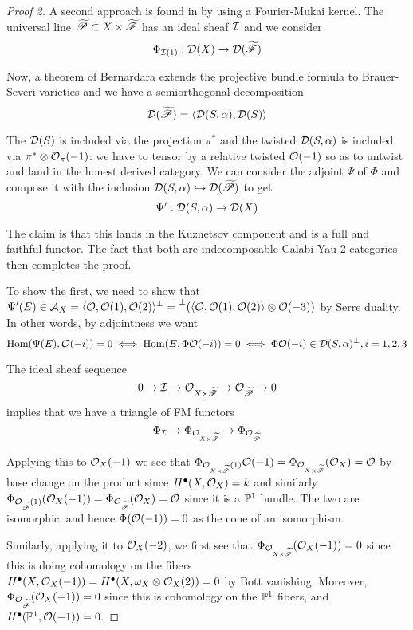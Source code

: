 \begin{proof}[Proof 2]
A second approach is found in \cite[\S7]{huybrechts_geometry_2023} by using a Fourier-Mukai kernel. The universal line $\tscrP\subset X \times \tscrF$ has an ideal sheaf $\calI$ and we consider $$\Phi_{\calI(1)}: \calD(X)\rightarrow \calD(\tscrF)$$

Now, a theorem of Bernardara \cite{bernardara_semiorthogonal_2005} extends the projective bundle formula to Brauer-Severi varieties and we have a semiorthogonal decomposition $$\calD(\tscrP)=\langle \calD(S,\alpha), \calD(S)\rangle$$

The $\calD(S)$ is included via the projection $\pi^*$ and the twisted $\calD(S,\alpha)$ is included via $\pi^*\otimes \O_\pi(-1)$: we have to tensor by a relative twisted $\O(-1)$ so as to untwist and land in the honest derived category. We can consider the adjoint $\Psi$ of $\Phi$ and compose it with the inclusion  $\calD(S,\alpha)\hookrightarrow \calD(\tscrP)$ to get $$\Psi':\calD(S,\alpha)\rightarrow \calD(X)$$

The claim is that this lands in the Kuznetsov component and is a full and faithful functor. The fact that both are indecomposable Calabi-Yau 2 categories then completes the proof.

To show the first, we need to show that $\Psi'(E)\in \calA_X= \langle \O, \O(1), \O(2)\rangle ^\perp = \lperp ( \langle \O, \O(1), \O(2)\rangle\otimes \O(-3))$ by Serre duality. In other words, by adjointness we want $$\Hom(\Psi(E), \O(-i))=0 \iff \Hom (E, \Phi \O(-i))=0 \iff \Phi \O(-i) \in \calD(S,\alpha)^\perp, i=1,2,3$$

The ideal sheaf sequence $$0\rightarrow \calI \rightarrow \O_{X\times \tscrF}\rightarrow \O_{\tscrP}\rightarrow 0$$ implies that we have a triangle of FM functors $$\Phi_{\cal I}\rightarrow \Phi_{\O_{X\times \tscrF}}\rightarrow \Phi_{\O_{\tscrP}}$$

Applying this to $\O_X(-1)$ we see that $\Phi_{\O_{X\times \tscrF}(1)}\O(-1)=\Phi_{\O_{X\times \tscrF}}(\O_X)=\O$ by base change on the product since $H^\bullet(X, \O_X)=k$ and similarly $\Phi_{\O_{\tscrP}(1)}(\O_X(-1))=\Phi_{\O_{\tscrP}}(\O_X)=\O$ since it is a $\P^1$ bundle. The two are isomorphic, and hence $\Phi(\O(-1))=0$ as the cone of an isomorphism.

Similarly, applying it to $\O_X(-2)$, we first see that $\Phi_{\O_{X\times \tscrF}}(\O_X(-1))=0$ since this is doing cohomology on the fibers $H^\bullet(X, \O_X(-1))=H^\bullet(X, \omega_X \otimes \O_X(2))=0$ by Bott vanishing. Moreover, $\Phi_{\O_{\tscrP}}(\O_X(-1))=0$ since this is cohomology on the $\P^1$ fibers, and $H^\bullet(\P^1, \O(-1))=0$.


\end{proof}
